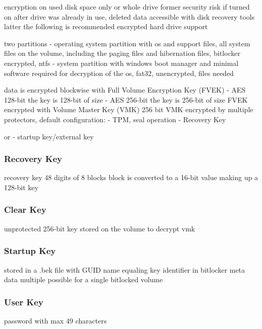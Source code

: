encryption on used disk space only or whole drive
former security risk if turned on after drive was already in use, deleted data accessible with disk recovery tools
latter the following is recommended
encrypted hard drive support

two partitions
- operating system partition with os and support files, all system files on the volume, including the paging files and hibernation files, bitlocker encrypted, ntfs
- system partition with windows boot manager and minimal software required for decryption of the os, fat32, unencrypted, files needed

data is encrypted blockwise with Full Volume Encryption Key (FVEK)
- AES 128-bit the key is 128-bit of size
- AES 256-bit the key is 256-bit of size
FVEK encrypted with Volume Master Key (VMK) 256 bit
VMK encrypted by multiple protectors, default configuration:
- TPM, seal operation
- Recovery Key

or
- startup key/external key

\subsubsection{Recovery Key}
recovery key 48 digits of 8 blocks
block is converted to a 16-bit value making up a 128-bit key

\subsubsection{Clear Key}
unprotected 256-bit key stored on the volume to decrypt vmk

\subsubsection{Startup Key}
stored in a .bek file with GUID name equaling key identifier in bitlocker meta data
multiple possible for a single bitlocked volume

\subsubsection{User Key}
password with max 49 characters
